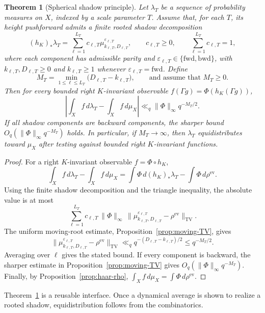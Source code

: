\documentclass[11pt]{amsart}
\theoremstyle{definition}
\theoremstyle{plain}
\newtheorem{theorem}[definition]{Theorem}
\newcommand{\TV}{\operatorname{TV}}
\newcommand{\fwd}{\mathrm{fwd}}
\newcommand{\bwd}{\mathrm{bwd}}
\newcommand{\ev}{\mathrm{ev}}
\begin{document}
\begin{theorem}[Spherical shadow principle]
\label{thm:shadow-principle}
Let \(\lambda_T\) be a sequence of probability measures on \(X\), indexed by a
scale parameter \(T\).  Assume that, for each \(T\), its height pushforward
admits a finite rooted shadow decomposition
\[
(h_K)_*\lambda_T
 =\sum_{\ell=1}^{L_T}c_{\ell,T}
   \mu^{\varepsilon_{\ell,T}}_{k_{\ell,T},D_{\ell,T}},
\qquad
c_{\ell,T}\ge0,
\qquad
\sum_{\ell=1}^{L_T}c_{\ell,T}=1,
\]
where each component has admissible parity and
\(\varepsilon_{\ell,T}\in\{\fwd,\bwd\}\), with
\(k_{\ell,T},D_{\ell,T}\ge0\) and \(k_{\ell,T}\ge1\) whenever
\(\varepsilon_{\ell,T}=\fwd\).  Define
\[
M_T=\min_{1\le\ell\le L_T}\bigl(D_{\ell,T}-k_{\ell,T}\bigr),
\qquad\text{and assume that }M_T\ge0.
\]
Then for every bounded right \(K\)-invariant observable
\(f(\Gamma g)=\Phi(h_K(\Gamma g))\),
\[
\left|\int_X f\,d\lambda_T-\int_X f\,d\mu_X\right|
\ll_q \|\Phi\|_\infty q^{-M_T/2}.
\]
If all shadow components are backward components, the sharper bound
\(O_q(\|\Phi\|_\infty q^{-M_T})\) holds.  In particular, if \(M_T\to\infty\), then
\(\lambda_T\) equidistributes toward \(\mu_X\) after testing against bounded right
\(K\)-invariant functions.
\end{theorem}

\begin{proof}
For a right \(K\)-invariant observable \(f=\Phi\circ h_K\),
\[
\int_X f\,d\lambda_T-\int_X f\,d\mu_X
=\int \Phi\,d(h_K)_*\lambda_T-\int \Phi\,d\rho^{\ev}.
\]
Using the finite shadow decomposition and the triangle inequality, the absolute
value is at most
\[
\sum_{\ell=1}^{L_T}c_{\ell,T}\,\|\Phi\|_\infty\,
\bigl\|\mu^{\varepsilon_{\ell,T}}_{k_{\ell,T},D_{\ell,T}}-\rho^{\ev}\bigr\|_{\TV}.
\]
The uniform moving-root estimate, Proposition~\ref{prop:moving-TV}, gives
\[
\bigl\|\mu^{\varepsilon_{\ell,T}}_{k_{\ell,T},D_{\ell,T}}-\rho^{\ev}\bigr\|_{\TV}
\ll_q q^{-(D_{\ell,T}-k_{\ell,T})/2}\le q^{-M_T/2}.
\]
Averaging over \(\ell\) gives the stated bound.  If every component is backward,
the sharper estimate in Proposition~\ref{prop:moving-TV} gives
\(O_q(\|\Phi\|_\infty q^{-M_T})\).  Finally, by
Proposition~\ref{prop:haar-rho}, \(\int_X f\,d\mu_X=\int \Phi\,d\rho^{\ev}\).
\end{proof}

Theorem~\ref{thm:shadow-principle} is a reusable interface.  Once a dynamical
average is shown to realize a rooted shadow, equidistribution follows from the
combinatorics.
\end{document}
